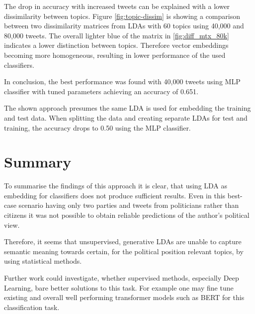 \documentclass[sigconf, nonacm]{acmart}
\begin{document}
The drop in accuracy with increased tweets can be explained with a lower dissimilarity between topics. 
Figure \ref{fig:topic-dissim} is showing a comparison between two dissimilarity matrices from LDAs with 60 topics using 40,000 and 80,000 tweets. 
The overall lighter blue of the matrix in \ref{fig:diff_mtx_80k} indicates a lower distinction between topics. 
Therefore vector embeddings becoming more homogeneous, resulting in lower performance of the used classifiers.

In conclusion, the best performance was found with 40,000 tweets using MLP classifier with tuned parameters achieving an accuracy of 0.651.

The shown approach presumes the same LDA is used for embedding the training and test data. 
When splitting the data and creating separate LDAs for test and training, the accuracy drops to 0.50 using the MLP classifier.

\section{Summary}
\label{sec:summ}
To summarise the findings of this approach it is clear, that using LDA as embedding for classifiers does not produce sufficient results. 
Even in this best-case scenario having only two parties and tweets from politicians rather than citizens it was not possible to obtain reliable predictions of the author's political view.

Therefore, it seems that unsupervised, generative LDAs are unable to capture semantic meaning towards certain, for the political position relevant topics, by using statistical methods.

Further work could investigate, whether supervised methods, especially Deep Learning, bare better solutions to this task. 
For example one may fine tune existing and overall well performing transformer models such as BERT for this classification task.



\end{document}
